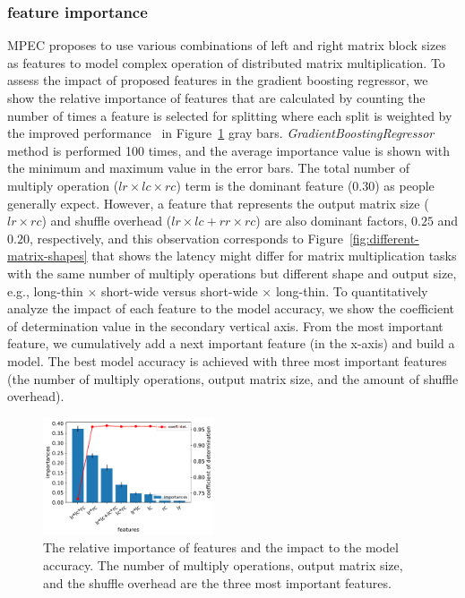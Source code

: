 \documentclass[10pt, conference, compsocconf]{IEEEtran}
\begin{document}
\subsubsection{feature importance} MPEC proposes to use various combinations of left and right matrix block sizes as features to model complex operation of distributed matrix multiplication. To assess the impact of proposed features in the gradient boosting regressor, we show the relative importance of features that are calculated by counting the number of times a feature is selected for splitting where each split is weighted by the improved performance~\cite{gb-feature-importance} in Figure~\ref{fig:feature-importance} gray bars. \emph{GradientBoostingRegressor} method is performed 100 times, and the average importance value is shown with the minimum and maximum value in the error bars. The total number of multiply operation ($lr \times lc \times rc$) term is the dominant feature (0.30) as people generally expect. However, a feature that represents the output matrix size ($lr \times rc$) and shuffle overhead ($lr \times lc + rr \times rc$) are also dominant factors, $0.25$ and $0.20$, respectively, and this observation corresponds to Figure~\ref{fig:different-matrix-shapes} that shows the latency might differ for matrix multiplication tasks with the same number of multiply operations but different shape and output size, e.g., long-thin $\times$ short-wide versus short-wide $\times$ long-thin. To quantitatively analyze the impact of each feature to the model accuracy, we show the coefficient of determination value in the secondary vertical axis. From the most important feature, we cumulatively add a next important feature (in the x-axis) and build a model. The best model accuracy is achieved with three most important features (the number of multiply operations, output matrix size, and the amount of shuffle overhead).

\begin{figure}
  \centering\includegraphics[width=0.45\textwidth]{figures/feature-importance.pdf}\caption{The relative importance of features and the impact to the model accuracy. The number of multiply operations, output matrix size, and  the shuffle overhead are the three most important features.}\label{fig:feature-importance}
\end{figure}
\end{document}
